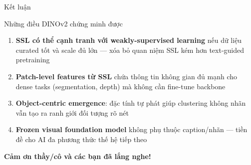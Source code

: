\documentclass[aspectratio=169]{beamer}
\begin{document}
\begin{frame}[t,shrink=15]{Kết luận}
    \begin{block}{Những điều DINOv2 chứng minh được}
        \begin{enumerate}
            \item \textbf{SSL có thể cạnh tranh với weakly-supervised learning} nếu dữ liệu curated tốt và scale đủ lớn --- xóa bỏ quan niệm SSL kém hơn text-guided pretraining
            \vspace{0.1cm}
            \item \textbf{Patch-level features từ SSL} chứa thông tin không gian đủ mạnh cho dense tasks (segmentation, depth) mà không cần fine-tune backbone
            \vspace{0.1cm}
            \item \textbf{Object-centric emergence}: đặc tính tự phát giúp clustering không nhãn vẫn tạo ra ranh giới đối tượng rõ nét
            \vspace{0.1cm}
            \item \textbf{Frozen visual foundation model} không phụ thuộc caption/nhãn --- tiền đề cho AI đa phương thức thế hệ tiếp theo
        \end{enumerate}
    \end{block}
    \vspace{0.15cm}
    \begin{center}
    \end{center}
\end{frame}

\begin{frame}[plain]
    \begin{center}
        \vspace{3cm}
        {\color{white}\Large\bfseries Cảm ơn thầy/cô và các bạn đã lắng nghe!}
    \end{center}
\end{frame}
\end{document}
